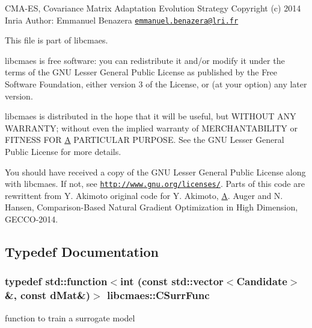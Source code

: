 C\-M\-A-\/\-E\-S, Covariance Matrix Adaptation Evolution Strategy Copyright (c) 2014 Inria Author\-: Emmanuel Benazera \href{mailto:emmanuel.benazera@lri.fr}{\tt emmanuel.\-benazera@lri.\-fr}

This file is part of libcmaes.

libcmaes is free software\-: you can redistribute it and/or modify it under the terms of the G\-N\-U Lesser General Public License as published by the Free Software Foundation, either version 3 of the License, or (at your option) any later version.

libcmaes is distributed in the hope that it will be useful, but W\-I\-T\-H\-O\-U\-T A\-N\-Y W\-A\-R\-R\-A\-N\-T\-Y; without even the implied warranty of M\-E\-R\-C\-H\-A\-N\-T\-A\-B\-I\-L\-I\-T\-Y or F\-I\-T\-N\-E\-S\-S F\-O\-R \hyperlink{classA}{A} P\-A\-R\-T\-I\-C\-U\-L\-A\-R P\-U\-R\-P\-O\-S\-E. See the G\-N\-U Lesser General Public License for more details.

You should have received a copy of the G\-N\-U Lesser General Public License along with libcmaes. If not, see \href{http://www.gnu.org/licenses/}{\tt http\-://www.\-gnu.\-org/licenses/}. Parts of this code are rewrittent from Y. Akimoto original code for Y. Akimoto, \hyperlink{classA}{A}. Auger and N. Hansen, Comparison-\/\-Based Natural Gradient Optimization in High Dimension, G\-E\-C\-C\-O-\/2014. 

\subsection{Typedef Documentation}
\hypertarget{namespacelibcmaes_ac7e88b4dfdaf94d6fa1e831ed5d9437e}{
\subsubsection[{C\-Surr\-Func}]{\setlength{\rightskip}{0pt plus 5cm}typedef std\-::function$<$int (const std\-::vector$<${\bf Candidate}$>$\&, const d\-Mat\&)$>$ {\bf libcmaes\-::\-C\-Surr\-Func}}}\label{namespacelibcmaes_ac7e88b4dfdaf94d6fa1e831ed5d9437e}


function to train a surrogate model 


